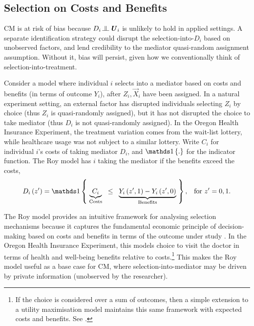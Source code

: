 \subsection{Selection on Costs and Benefits}
CM is at risk of bias because $D_i \indep  \vec U_i$ %
is unlikely to hold in applied settings.
A separate identification strategy could disrupt the selection-into-$D_i$ based on unobserved factors, and lend credibility to the mediator quasi-random assignment assumption.
Without it, bias will persist, given how we conventionally think of selection-into-treatment.

Consider a model where individual $i$ selects into a mediator based on costs and benefits (in terms of outcome $Y_i$), after $Z_i, \vec X_i$ have been assigned.
In a natural experiment setting, an external factor has disrupted individuals selecting $Z_i$ by choice (thus $Z_i$ is quasi-randomly assigned), but it has not disrupted the choice to take mediator (thus $D_i$ is not quasi-randomly assigned).
In the Oregon Health Insurance Experiment, the treatment variation comes from the wait-list lottery, while healthcare usage was not subject to a similar lottery.
Write $C_i$ for individual $i$'s costs of taking mediator $D_i$, and $\indicator{.}$ for the indicator function.
The Roy model has $i$ taking the mediator if the benefits exceed the costs,
\begin{equation}
    \label{eqn:roy-model}
    D_i \left( z' \right) = \indicator{ \;
    \underbrace{C_i}_{\text{Costs}} \;\; \leq \;\;
        \underbrace{
            Y_i\left( z', 1 \right) - Y_i\left( z', 0 \right)}_{\text{Benefits}}
    \;}, \;\;\; \text{for } z'=0,1.
\end{equation}

The Roy model provides an intuitive framework for analysing selection mechanisms because it captures the fundamental economic principle of decision-making based on costs and benefits in terms of the outcome under study \citep{roy1951some,heckman1990empirical}.
In the Oregon Health Insurance Experiment, this models choice to visit the doctor in terms of health and well-being benefits relative to costs.\footnote{
    If the choice is considered over a sum of outcomes, then a simple extension to a utility maximisation model maintains this same framework with expected costs and benefits.
    See \cite{heckman1990empirical,eisenhauer2015generalized}.
}
This makes the Roy model useful as a base case for CM, where selection-into-mediator may be driven by private information (unobserved by the researcher).

